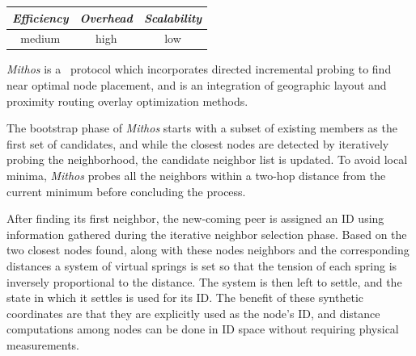 \begin{center}
\begin{tabular}{ccc}
\emph{Efficiency} & \emph{Overhead} & \emph{Scalability} \\
\hline
medium &
high &
low
\end{tabular}
\end{center}

\emph{Mithos} \cite{WR2003} is a \p\ protocol which incorporates directed
incremental probing to find near optimal node placement, and is an integration
of geographic layout and proximity routing overlay optimization methods.

The bootstrap phase of \emph{Mithos} starts with a subset of existing members as
the first set of candidates, and while the closest nodes are detected by iteratively
probing the neighborhood, the candidate neighbor list is updated. To
avoid local minima, \emph{Mithos} probes all the neighbors within a two-hop distance
from the current minimum before concluding the process.

After finding its first neighbor, the new-coming peer is assigned an ID using
information gathered during the iterative neighbor selection phase. Based on the
two closest nodes found, along with these nodes neighbors and the corresponding
distances a system of virtual springs is set so that the tension of each spring
is inversely proportional to the distance. The system is then left to settle,
and the state in which it settles is used for its ID. The benefit of these
synthetic coordinates are that
they are explicitly used as the node's ID, and distance computations among nodes
can be done in ID space without requiring physical measurements.

